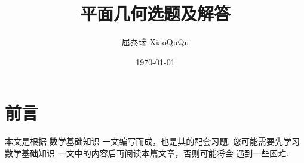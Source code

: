 \documentclass[a4paper]{article}
\title{平面几何选题及解答}
\author{屈泰瑞 XiaoQuQu}
\date{\today}
\begin{document}
\maketitle

\newpage

\section{前言}

本文是根据 数学基础知识 一文编写而成，也是其的配套习题. 您可能需要先学习 数学基础知识 一文中的内容后再阅读本篇文章，否则可能将会
遇到一些困难.
\end{document}

